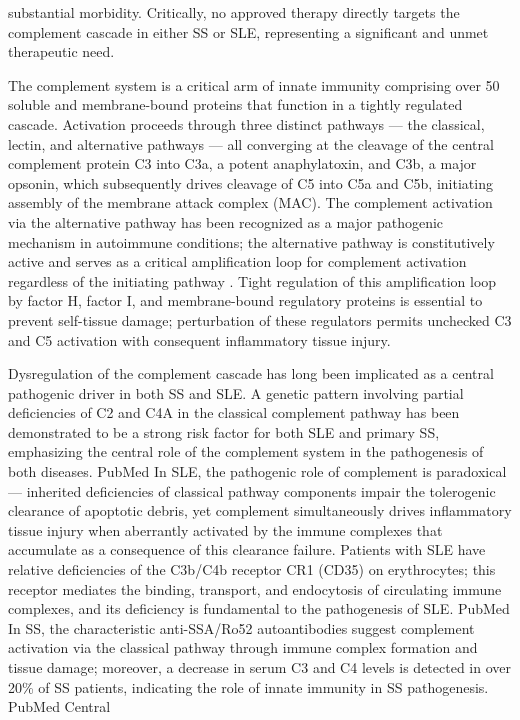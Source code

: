 \documentclass[times, twoside, watermark]{zHenriquesLab-StyleBioRxiv}
\begin{document}
substantial morbidity. Critically, no approved therapy directly targets the complement cascade in either SS or SLE, representing a significant and unmet therapeutic need.
	
	The complement system is a critical arm of innate immunity comprising over 50 soluble and membrane-bound proteins that function in a tightly regulated cascade. Activation proceeds through three distinct pathways — the classical, lectin, and alternative pathways — all converging at the cleavage of the central complement protein C3 into C3a, a potent anaphylatoxin, and C3b, a major opsonin, which subsequently drives cleavage of C5 into C5a and C5b, initiating assembly of the membrane attack complex (MAC). The complement activation via the alternative pathway has been recognized as a major pathogenic mechanism in autoimmune conditions; the alternative pathway is constitutively active and serves as a critical amplification loop for complement activation regardless of the initiating pathway \cite{Legatowicz_Koprowska_2020}. Tight regulation of this amplification loop by factor H, factor I, and membrane-bound regulatory proteins is essential to prevent self-tissue damage; perturbation of these regulators permits unchecked C3 and C5 activation with consequent inflammatory tissue injury.
	
	Dysregulation of the complement cascade has long been implicated as a central pathogenic driver in both SS and SLE. A genetic pattern involving partial deficiencies of C2 and C4A in the classical complement pathway has been demonstrated to be a strong risk factor for both SLE and primary SS, emphasizing the central role of the complement system in the pathogenesis of both diseases. PubMed In SLE, the pathogenic role of complement is paradoxical — inherited deficiencies of classical pathway components impair the tolerogenic clearance of apoptotic debris, yet complement simultaneously drives inflammatory tissue injury when aberrantly activated by the immune complexes that accumulate as a consequence of this clearance failure. Patients with SLE have relative deficiencies of the C3b/C4b receptor CR1 (CD35) on erythrocytes; this receptor mediates the binding, transport, and endocytosis of circulating immune complexes, and its deficiency is fundamental to the pathogenesis of SLE. PubMed In SS, the characteristic anti-SSA/Ro52 autoantibodies suggest complement activation via the classical pathway through immune complex formation and tissue damage; moreover, a decrease in serum C3 and C4 levels is detected in over 20\% of SS patients, indicating the role of innate immunity in SS pathogenesis. PubMed Central
	
\end{document}
